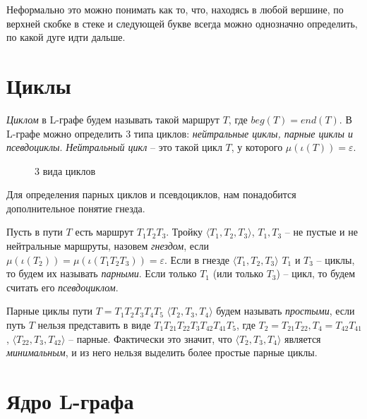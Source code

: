 Неформально это можно понимать как то, что, находясь в любой вершине, 
по верхней скобке в стеке и следующей букве всегда можно однозначно определить, по какой дуге идти дальше.

\section{Циклы}

\emph{Циклом} в L-графе будем называть такой маршрут $T$, где $beg(T) = end(T)$. 
В L-графе можно определить 3 типа циклов: \emph{нейтральные циклы, парные циклы и псевдоциклы}.
\emph{Нейтральный цикл} -- это такой цикл $T$, у которого $\mu(\iota(T)) = \varepsilon$.

\begin{figure}
    \centering
    \qquad
    \qquad
    \caption{3 вида циклов}
    \label{loop-kinds-example}
\end{figure}


Для определения парных циклов и псевдоциклов, нам понадобится дополнительное понятие гнезда.

Пусть в пути $T$ есть маршрут $T_1 T_2 T_3$. 
Тройку $\langle T_1, T_2, T_3 \rangle$, $T_1, T_3$ -- не пустые и не нейтральные маршруты, назовем \emph{гнездом}, 
если $\mu(\iota(T_2)) = \mu(\iota(T_1 T_2 T_3)) = \varepsilon$.
Если в гнезде $\langle T_1, T_2, T_3 \rangle$ $T_1$ и $T_3$ -- циклы, то будем их называть \emph{парными}.
Если только $T_1$ (или только $T_3$) -- цикл, то будем считать его \emph{псевдоциклом}.

Парные циклы пути $T = T_1 T_2 T_3 T_4 T_5$ $\langle T_2, T_3, T_4 \rangle$ будем называть \emph{простыми}, если
путь $T$ нельзя представить в виде $T_1 T_{21} T_{22} T_3 T_{42} T_{41} T_5$, где $T_2 = T_{21} T_{22}, T_4 = T_{42} T_{41}$,
$\langle T_{22}, T_3, T_{42} \rangle$ -- парные. Фактически это значит, что $\langle T_2, T_3, T_4\rangle$ является
\emph{минимальным}, и из него нельзя выделить более простые парные циклы.

\section{Ядро L-графа}

